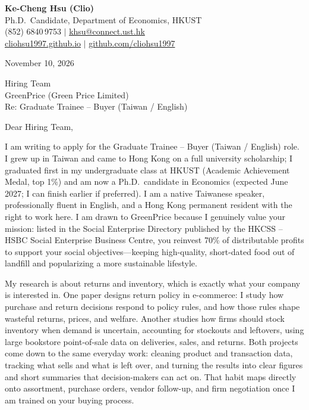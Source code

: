 \documentclass[11pt,letterpaper]{article}
\begin{document}
\noindent
{\bfseries Ke-Cheng Hsu (Clio)}\\
Ph.D.\ Candidate, Department of Economics, HKUST\\
(852) 6840\,9753 \quad $|$ \quad \href{mailto:khsu@connect.ust.hk}{khsu@connect.ust.hk}\\
\href{https://cliohsu1997.github.io/}{cliohsu1997.github.io} \quad $|$ \quad \href{https://github.com/cliohsu1997}{github.com/cliohsu1997}

\vspace{0.7em}
\noindent
November 10, 2026

\vspace{0.35em}
\noindent
Hiring Team\\
GreenPrice (Green Price Limited)\\
Re: Graduate Trainee -- Buyer (Taiwan / English)

\vspace{0.2em}
Dear Hiring Team,

I am writing to apply for the Graduate Trainee -- Buyer (Taiwan / English) role. I grew up in Taiwan and came to Hong Kong on a full university scholarship; I graduated first in my undergraduate class at HKUST (Academic Achievement Medal, top 1\%) and am now a Ph.D.\ candidate in Economics (expected June 2027; I can finish earlier if preferred). I am a native Taiwanese speaker, professionally fluent in English, and a Hong Kong permanent resident with the right to work here. I am drawn to GreenPrice because I genuinely value your mission: listed in the Social Enterprise Directory published by the HKCSS -- HSBC Social Enterprise Business Centre, you reinvest 70\% of distributable profits to support your social objectives---keeping high-quality, short-dated food out of landfill and popularizing a more sustainable lifestyle.

My research is about returns and inventory, which is exactly what your company is interested in. One paper designs return policy in e-commerce: I study how purchase and return decisions respond to policy rules, and how those rules shape wasteful returns, prices, and welfare. Another studies how firms should stock inventory when demand is uncertain, accounting for stockouts and leftovers, using large bookstore point-of-sale data on deliveries, sales, and returns. Both projects come down to the same everyday work: cleaning product and transaction data, tracking what sells and what is left over, and turning the results into clear figures and short summaries that decision-makers can act on. That habit maps directly onto assortment, purchase orders, vendor follow-up, and firm negotiation once I am trained on your buying process.
\end{document}
